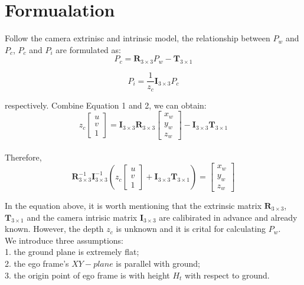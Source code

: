 \documentclass[
	letterpaper, %
	10pt, %
]{CSUniSchoolLabReport}
\begin{document}
\section{Formualation}
Follow the camera extrinisc and intrinsic model, the relationship between $P_w$ and $P_c$, $P_c$ and $P_i$ are formulated as:
\begin{equation}
P_c = \bm{R}_{3\times 3} P_w - \bm{T}_{3\times 1}
\end{equation}

\begin{equation}
P_i = \frac{1}{z_c}\bm{I}_{3\times 3} P_c
\end{equation}

respectively. Combine Equation 1 and 2, we can obtain:
\begin{equation}
z_c \begin{bmatrix}
u \\
v \\
1
\end{bmatrix} = \bm{I}_{3\times 3}\bm{R}_{3\times 3} \begin{bmatrix}
x_w \\
y_w \\
z_w
\end{bmatrix} - \bm{I}_{3\times 3}\bm{T}_{3\times 1}
\end{equation} \\

Therefore, 
\begin{equation}
\bm{R}^{-1}_{3\times 3}\bm{I}^{-1}_{3\times 3}\left(z_c \begin{bmatrix}
u \\
v \\
1
\end{bmatrix} + \bm{I}_{3\times 3}\bm{T}_{3\times 1} \right) = \begin{bmatrix}
x_w \\
y_w \\
z_w
\end{bmatrix}
\end{equation}

In the equation above, it is worth mentioning that the extrinsic matrix $\bm{R}_{3\times 3}$, 
$\bm{T}_{3\times 1}$ and the camera intrisic matrix $\bm{I}_{3\times 3}$ are calibirated in advance and already known. However, the depth $z_c$ is unknown and it is crital for calculating $P_w$. \\

We introduce three assumptions:\\
1. the ground plane is extremely flat; \\
2. the ego frame's $XY-plane$ is parallel with ground; \\
3. the origin point of ego frame is with height $H_t$ with respect to ground. \\
\end{document}

